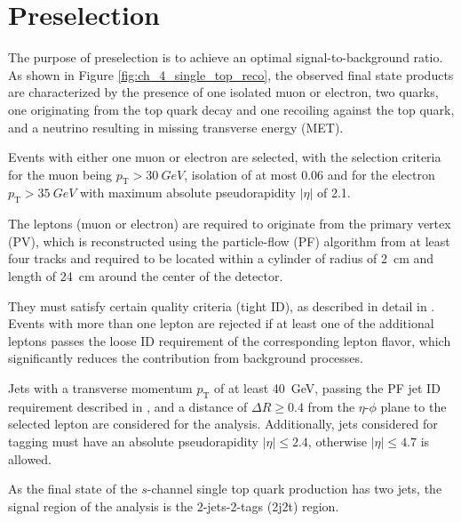 \section{Preselection}
\label{sec:ch-4-preselection}
The purpose of preselection is to achieve an optimal signal-to-background ratio. As shown in Figure \ref{fig:ch_4_single_top_reco}, the observed final state products are characterized by the presence of one isolated muon or electron, two \Pbottom quarks, one originating from the top quark decay and one recoiling against the top quark, and a neutrino resulting in missing transverse energy (MET).

Events with either one muon or electron are selected, with the selection criteria for the muon being $p_\text{T} > \SI{30}{GeV}$, isolation of at most 0.06 and for the electron $p_\text{T} > \SI{35}{GeV}$ with maximum absolute pseudorapidity $|\eta|$ of 2.1.

The leptons (muon or electron) are required to originate from the primary vertex (PV), which is reconstructed using the particle-flow (PF) algorithm \cite{2014arXiv1401.8155B} from at least four tracks and required to be located within a cylinder of radius of \SI{2}{cm} and length of \SI{24}{cm} around the center of the detector. 

They must satisfy certain quality criteria (tight ID), as described in detail in \cite{CMS-Muon-Physics,CMS-Electron-Physics}. Events with more than one lepton are rejected if at least one of the additional leptons passes the loose ID requirement of the corresponding lepton flavor, which significantly reduces the contribution from background processes.

Jets with a transverse momentum $p_\text{T}$ of at least \SI{40}{GeV}, passing the PF jet ID requirement described in \cite{CMS-PAS-JME-16-003}, and a distance of $\Delta R \geq 0.4$ from the $\eta$-$\phi$ plane to the selected lepton are considered for the analysis. Additionally, jets considered for \Pbottom tagging must have an absolute pseudorapidity $|\eta| \leq 2.4$, otherwise $|\eta| \leq 4.7$ is allowed.

As the final state of the $s$-channel single top quark production has two \Pbottom jets, the signal region of the analysis is the 2-jets-2-tags (2j2t) region.

